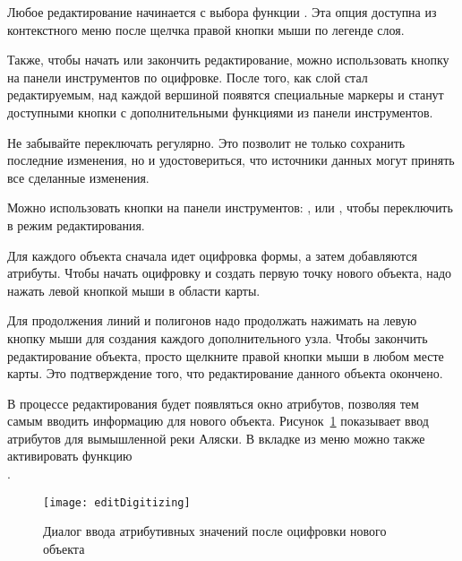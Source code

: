 Любое редактирование начинается с выбора функции
.
Эта опция доступна из контекстного меню после щелчка правой кнопки мыши
по легенде слоя.

Также, чтобы начать или закончить редактирование, можно использовать
кнопку 
 на панели инструментов
по оцифровке. После того, как слой стал редактируемым,
над каждой вершиной появятся специальные маркеры и станут доступными кнопки
с дополнительными функциями из панели инструментов.

\begin{Tip}\caption{\textsc{Регулярное сохранение}}
Не забывайте переключать 
регулярно. Это позволит не только сохранить последние изменения, но и удостовериться,
что источники данных могут принять все сделанные изменения.
\end{Tip}


Можно использовать кнопки на панели инструментов:
,
 или
, чтобы переключить \qg
в режим редактирования.

Для каждого объекта сначала идет оцифровка формы, а затем добавляются атрибуты.
Чтобы начать оцифровку и создать первую точку нового объекта, надо нажать
левой кнопкой мыши в области карты.

Для продолжения линий и полигонов надо продолжать нажимать на левую кнопку
мыши для создания каждого дополнительного узла. Чтобы закончить
редактирование объекта, просто щелкните правой кнопки мыши в любом
месте карты. Это подтверждение того, что редактирование данного объекта
окончено.

В процессе редактирования будет появляться окно атрибутов, позволяя тем
самым вводить информацию для нового объекта.
Рисунок~\ref{fig:vector_digitising} показывает ввод атрибутов для вымышленной реки
Аляски. В вкладке  из меню  \arrow
{} можно также активировать функцию \\
.

\begin{figure}[ht]
   \centering
   \texttt{[image: editDigitizing]}
   \caption{Диалог ввода атрибутивных значений после оцифровки нового объекта \wincaption}\label{fig:vector_digitising}
 \end{figure}

